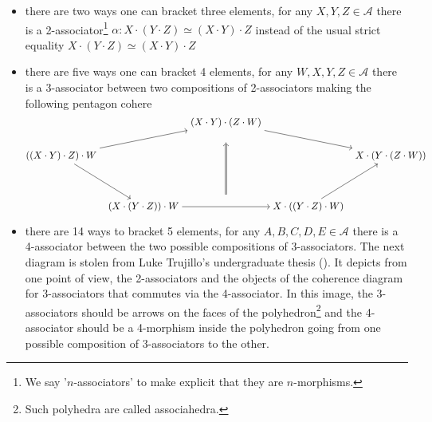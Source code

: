 \begin{itemize}
    \item there are two ways one can bracket three elements, for any $X,Y,Z\in \mathcal{A}$ there is a
    2-associator\footnote{We say '$n$-associators' to make explicit that they are $n$-morphisms.} $\alpha:X\cdot(Y\cdot Z)\simeq(X\cdot Y)\cdot Z$ 
    instead of the usual strict equality $X\cdot(Y\cdot Z)\simeq(X\cdot Y)\cdot Z$
    \item there are five ways one can bracket 4 elements, for any $W,X,Y,Z\in \mathcal{A}$ there is a
    3-associator between two compositions of 2-associators making the following pentagon cohere 
    \[\begin{tikzcd}[cramped, column sep=tiny]
        && {(X\cdot Y)\cdot(Z\cdot W) } \\
        {((X\cdot Y)\cdot Z)\cdot W} &&&& {X\cdot (Y\cdot (Z\cdot W))} \\
        \\
        & {(X\cdot (Y\cdot Z))\cdot W} && {X\cdot((Y\cdot Z)\cdot W)}
        \arrow[from=2-1, to=1-3]
        \arrow[from=2-1, to=4-2]
        \arrow[""{name=0, anchor=center, inner sep=0}, from=4-2, to=4-4]
        \arrow[from=1-3, to=2-5]
        \arrow[from=4-4, to=2-5]
        \arrow[shorten <=12pt, shorten >=12pt, Rightarrow, from=0, to=1-3]
    \end{tikzcd}\]
    \item there are 14 ways to bracket 5 elements, for any $A,B,C,D,E\in\mathcal{A}$ there is a 4-associator
    between the two possible compositions of 3-associators. The next diagram is stolen from Luke Trujillo's
    undergraduate thesis (\cite{TrujilloCoherence}). It depicts from one point of view,
    the 2-associators and the objects of the 
    coherence diagram for 3-associators that commutes via the 4-associator. In this image, the
     3-associators
    should be arrows on the faces of the polyhedron\footnote{Such polyhedra are called associahedra.}
     and 
    the 4-associator should be a 4-morphism inside the polyhedron going from one possible composition of 3-associators to the other.
    

\end{itemize}
